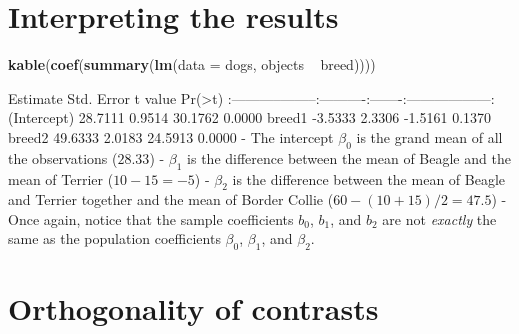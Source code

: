 \documentclass[]{article}
\newenvironment{Shaded}{}{}
\newcommand{\KeywordTok}[1]{\textcolor[rgb]{0.00,0.44,0.13}{\textbf{{#1}}}}
\newcommand{\DataTypeTok}[1]{\textcolor[rgb]{0.56,0.13,0.00}{{#1}}}
\newcommand{\StringTok}[1]{\textcolor[rgb]{0.25,0.44,0.63}{{#1}}}
\newcommand{\NormalTok}[1]{{#1}}
\begin{document}
\begin{Shaded}
\end{Shaded}

\section{Interpreting the results}\label{interpreting-the-results}

\begin{Shaded}
\begin{Highlighting}[]
\KeywordTok{kable}\NormalTok{(}\KeywordTok{coef}\NormalTok{(}\KeywordTok{summary}\NormalTok{(}\KeywordTok{lm}\NormalTok{(}\DataTypeTok{data =} \NormalTok{dogs, objects ~}\StringTok{ }\NormalTok{breed))))}
\end{Highlighting}
\end{Shaded}

\textbar{} \textbar{} Estimate\textbar{} Std. Error\textbar{} t
value\textbar{} Pr(\textgreater{}\textbar{}t\textbar{})\textbar{}
\textbar{}:-----------\textbar{}--------:\textbar{}----------:\textbar{}-------:\textbar{}------------------:\textbar{}
\textbar{}(Intercept) \textbar{} 28.7111\textbar{} 0.9514\textbar{}
30.1762\textbar{} 0.0000\textbar{} \textbar{}breed1 \textbar{}
-3.5333\textbar{} 2.3306\textbar{} -1.5161\textbar{} 0.1370\textbar{}
\textbar{}breed2 \textbar{} 49.6333\textbar{} 2.0183\textbar{}
24.5913\textbar{} 0.0000\textbar{} - The intercept $\beta_0$ is the
grand mean of all the observations ($28.33$) - $\beta_1$ is the
difference between the mean of Beagle and the mean of Terrier
($10 - 15 = -5$) - $\beta_2$ is the difference between the mean of
Beagle and Terrier together and the mean of Border Collie
($60 - (10+15)/2 = 47.5$) - Once again, notice that the sample
coefficients $b_0$, $b_1$, and $b_2$ are not \emph{exactly} the same as
the population coefficients $\beta_0$, $\beta_1$, and $\beta_2$.

\section{Orthogonality of contrasts}\label{orthogonality-of-contrasts}
\end{document}
